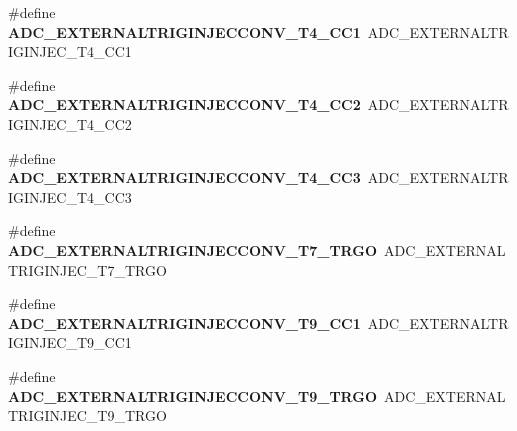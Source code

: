 \begin{DoxyCompactItemize}
\item 
\hypertarget{group___a_d_c_ex___external__trigger__source___injected_gac8c79cb920a15b5bcb36ec499a18a8a1}{\#define {\bfseries A\-D\-C\-\_\-\-E\-X\-T\-E\-R\-N\-A\-L\-T\-R\-I\-G\-I\-N\-J\-E\-C\-C\-O\-N\-V\-\_\-\-T4\-\_\-\-C\-C1}~A\-D\-C\-\_\-\-E\-X\-T\-E\-R\-N\-A\-L\-T\-R\-I\-G\-I\-N\-J\-E\-C\-\_\-\-T4\-\_\-\-C\-C1}\label{group___a_d_c_ex___external__trigger__source___injected_gac8c79cb920a15b5bcb36ec499a18a8a1}

\item 
\hypertarget{group___a_d_c_ex___external__trigger__source___injected_ga134659fcece2d4ef1902545b3a950712}{\#define {\bfseries A\-D\-C\-\_\-\-E\-X\-T\-E\-R\-N\-A\-L\-T\-R\-I\-G\-I\-N\-J\-E\-C\-C\-O\-N\-V\-\_\-\-T4\-\_\-\-C\-C2}~A\-D\-C\-\_\-\-E\-X\-T\-E\-R\-N\-A\-L\-T\-R\-I\-G\-I\-N\-J\-E\-C\-\_\-\-T4\-\_\-\-C\-C2}\label{group___a_d_c_ex___external__trigger__source___injected_ga134659fcece2d4ef1902545b3a950712}

\item 
\hypertarget{group___a_d_c_ex___external__trigger__source___injected_ga80d91502e0ca3757db39eeb8a637da4d}{\#define {\bfseries A\-D\-C\-\_\-\-E\-X\-T\-E\-R\-N\-A\-L\-T\-R\-I\-G\-I\-N\-J\-E\-C\-C\-O\-N\-V\-\_\-\-T4\-\_\-\-C\-C3}~A\-D\-C\-\_\-\-E\-X\-T\-E\-R\-N\-A\-L\-T\-R\-I\-G\-I\-N\-J\-E\-C\-\_\-\-T4\-\_\-\-C\-C3}\label{group___a_d_c_ex___external__trigger__source___injected_ga80d91502e0ca3757db39eeb8a637da4d}

\item 
\hypertarget{group___a_d_c_ex___external__trigger__source___injected_ga86744b33808acc5173008050100781cc}{\#define {\bfseries A\-D\-C\-\_\-\-E\-X\-T\-E\-R\-N\-A\-L\-T\-R\-I\-G\-I\-N\-J\-E\-C\-C\-O\-N\-V\-\_\-\-T7\-\_\-\-T\-R\-G\-O}~A\-D\-C\-\_\-\-E\-X\-T\-E\-R\-N\-A\-L\-T\-R\-I\-G\-I\-N\-J\-E\-C\-\_\-\-T7\-\_\-\-T\-R\-G\-O}\label{group___a_d_c_ex___external__trigger__source___injected_ga86744b33808acc5173008050100781cc}

\item 
\hypertarget{group___a_d_c_ex___external__trigger__source___injected_ga8f512b08e0096bb823551f6e545cebe1}{\#define {\bfseries A\-D\-C\-\_\-\-E\-X\-T\-E\-R\-N\-A\-L\-T\-R\-I\-G\-I\-N\-J\-E\-C\-C\-O\-N\-V\-\_\-\-T9\-\_\-\-C\-C1}~A\-D\-C\-\_\-\-E\-X\-T\-E\-R\-N\-A\-L\-T\-R\-I\-G\-I\-N\-J\-E\-C\-\_\-\-T9\-\_\-\-C\-C1}\label{group___a_d_c_ex___external__trigger__source___injected_ga8f512b08e0096bb823551f6e545cebe1}

\item 
\hypertarget{group___a_d_c_ex___external__trigger__source___injected_gacd5bd866b5dc6afcb4efd12fa7fbe88d}{\#define {\bfseries A\-D\-C\-\_\-\-E\-X\-T\-E\-R\-N\-A\-L\-T\-R\-I\-G\-I\-N\-J\-E\-C\-C\-O\-N\-V\-\_\-\-T9\-\_\-\-T\-R\-G\-O}~A\-D\-C\-\_\-\-E\-X\-T\-E\-R\-N\-A\-L\-T\-R\-I\-G\-I\-N\-J\-E\-C\-\_\-\-T9\-\_\-\-T\-R\-G\-O}\label{group___a_d_c_ex___external__trigger__source___injected_gacd5bd866b5dc6afcb4efd12fa7fbe88d}


\end{DoxyCompactItemize}
